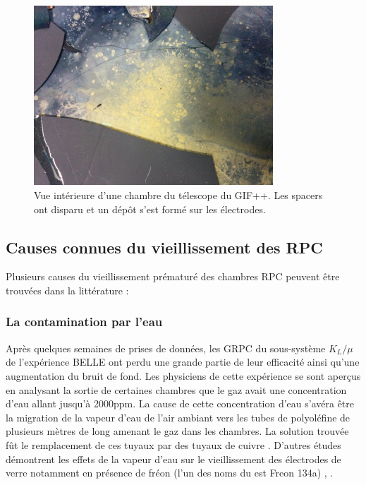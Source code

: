 \begin{figure}[!ht]
	\centering
	\includegraphics[width=0.8\textwidth]{GLA/depot.jpg}
	\caption{Vue intérieure d'une chambre du télescope du GIF++. Les spacers ont disparu et un dépôt s'est formé sur les électrodes. }
	\label{depot}
\end{figure}

\subsection{Causes connues du vieillissement des RPC }
Plusieurs causes du vieillissement prématuré des chambres RPC peuvent être trouvées dans la littérature :

\subsubsection{La contamination par l'eau}
Après quelques semaines de prises de données, les GRPC du sous-système $K_{L}/\mu$ de l'expérience BELLE ont perdu une grande partie de leur efficacité ainsi qu'une augmentation du bruit de fond. Les physiciens de cette expérience se sont aperçus en analysant la sortie de certaines chambres que le gaz avait une concentration d'eau allant jusqu'à \num{2000}ppm. La cause de cette concentration d'eau s'avéra être la migration de la vapeur d'eau de l'air ambiant  vers les tubes de polyoléfine de plusieurs mètres de long amenant le gaz dans les chambres. La solution trouvée fût le remplacement de ces tuyaux par des tuyaux de cuivre \cite{Abashian:2000vb}. D'autres études démontrent les effets de la vapeur d'eau sur le vieillissement des électrodes de verre notamment en présence de fréon (l'un des noms du  est Freon 134a) \cite{Sakai:772080}, \cite{Kubo:2002jq}.

